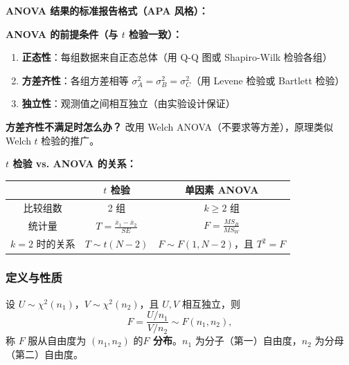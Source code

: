 \medskip
\textbf{ANOVA 结果的标准报告格式（APA 风格）：}

\begin{center}
\end{center}

\medskip
\textbf{ANOVA 的前提条件（与 $t$ 检验一致）：}

\begin{enumerate}[label=(\arabic*)]
    \item \textbf{正态性}：每组数据来自正态总体（用 Q-Q 图或 Shapiro-Wilk 检验各组）
    \item \textbf{方差齐性}：各组方差相等 $\sigma_A^2 = \sigma_B^2 = \sigma_C^2$（用 Levene 检验或 Bartlett 检验）
    \item \textbf{独立性}：观测值之间相互独立（由实验设计保证）
\end{enumerate}

\textbf{方差齐性不满足时怎么办？} 改用 Welch ANOVA（不要求等方差），原理类似 Welch $t$ 检验的推广。

\medskip
\textbf{$t$ 检验 vs. ANOVA 的关系：}

\begin{center}
\renewcommand{\arraystretch}{1.3}
\begin{tabular}{c|c|c}
\toprule
& \textbf{$t$ 检验} & \textbf{单因素 ANOVA} \\
\midrule
比较组数 & 2 组 & $k \ge 2$ 组 \\
统计量 & $T = \frac{\bar{x}_1 - \bar{x}_2}{SE}$ & $F = \frac{MS_B}{MS_W}$ \\
$k=2$ 时的关系 & $T \sim t(N-2)$ & $F \sim F(1, N-2)$，且 $T^2 = F$ \\
\bottomrule
\end{tabular}
\end{center}

\subsubsection{定义与性质}

\begin{definition}[$F$ 分布]
设 $U \sim \chi^2(n_1)$，$V \sim \chi^2(n_2)$，且 $U, V$ 相互独立，则
\begin{equation}
    F = \frac{U / n_1}{V / n_2} \sim F(n_1, n_2),
\end{equation}
称 $F$ 服从自由度为 $(n_1, n_2)$ 的\textbf{$F$ 分布}。$n_1$ 为分子（第一）自由度，$n_2$ 为分母（第二）自由度。
\end{definition}

